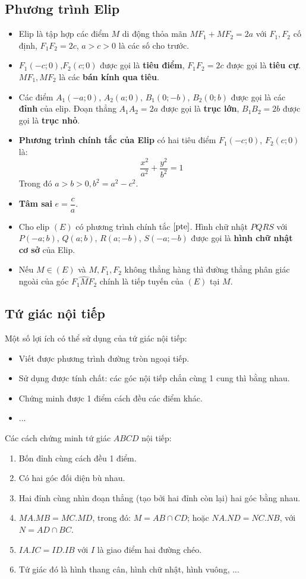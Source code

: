 \subsection{Phương trình Elip}
\begin{itemize}
\item Elip là tập hợp các điểm $M$ di động thỏa mãn $MF_1+MF_2=2a$ với $F_1, F_2$ cố định, $F_1F_2=2c$, $a>c>0$ là các số cho trước. 
\item $F_1(-c;0)$,$F_2(c;0)$ được gọi là \textbf{tiêu điểm}, $F_1F_2=2c$ được gọi là \textbf{tiêu cự}. $MF_1,MF_2$ là các \textbf{bán kính qua tiêu}.
\item Các điểm $A_1(-a;0)$, $A_2(a;0)$, $B_1(0;-b)$, $B_2(0;b)$ được gọi là các \textbf{đỉnh} của elip. Đoạn thẳng $A_1A_2=2a$ được gọi là \textbf{trục lớn}, $B_1B_2=2b$ được gọi là \textbf{trục nhỏ}.
\item \textbf{Phương trình chính tắc của Elip} có hai tiêu điểm $F_1(-c;0)$, $F_2(c;0)$ là:
\begin{equation} \label{pte}
\dfrac{x^2}{a^2}+\dfrac{y^2}{b^2}=1
\end{equation}
Trong đó $a>b>0, b^2=a^2-c^2$.
\item \textbf{Tâm sai} $e=\dfrac{c}{a}$.
\item Cho elip $(E)$ có phương trình chính tắc $\eqref{pte}$. Hình chữ nhật $PQRS$ với $P(-a;b)$, $Q(a;b)$, $R(a;-b)$, $S(-a;-b)$ được gọi là \textbf{hình chữ nhật cơ sở} của Elip.
\item Nếu $M\in (E)$ và $M,F_1,F_2$ không thẳng hàng thì đường thẳng phân giác ngoài của góc $\widehat{F_1MF_2}$ chính là tiếp tuyến của $(E)$ tại $M$.
\end{itemize}
\subsection{Tứ giác nội tiếp}
Một số lợi ích có thể sử dụng của tứ giác nội tiếp:
\begin{itemize}
\item Viết được phương trình đường tròn ngoại tiếp.
\item Sử dụng được tính chất: các góc nội tiếp chắn cùng 1 cung thì bằng nhau.
\item Chứng minh được 1 điểm cách đều các điểm khác.
\item ...
\end{itemize}
Các cách chứng minh tứ giác $ABCD$ nội tiếp:
\begin{enumerate}
\item Bốn đỉnh cùng cách đều 1 điểm.
\item Có hai góc đối diện bù nhau.
\item Hai đỉnh cùng nhìn đoạn thẳng (tạo bởi hai đỉnh còn lại) hai góc bằng nhau.
\item $MA.MB=MC.MD$, trong đó: $M=AB\cap CD$; hoặc $NA.ND=NC.NB$, với $N=AD \cap BC$.
\item $IA.IC=ID.IB$ với $I$ là giao điểm hai đường chéo.
\item Tứ giác đó là hình thang cân, hình chữ nhật, hình vuông, ...
\end{enumerate}
